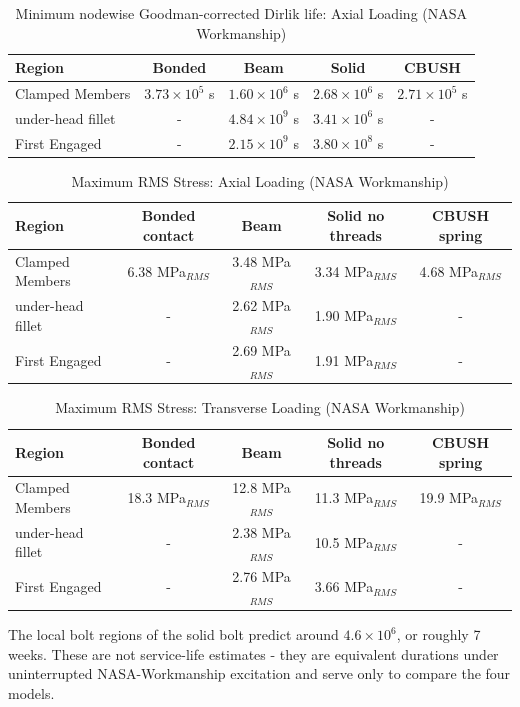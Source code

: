 \documentclass[a4paper,twoside]{bth}
\begin{document}
\begin{table}[H]
    \centering
    \caption{Minimum nodewise Goodman-corrected Dirlik life: Axial Loading (NASA Workmanship)}
    \label{tab:MinLifeVtical}
    \begin{tabular}{lcccc}
        \toprule
        Region          & Bonded               & Beam                  & Solid                 & CBUSH                  \\
        \midrule
        Clamped Members & $3.73\times10^{5}$ s & $1.60\times10^{6}$ s  & $2.68\times10^{6}$ s  & $2.71\times10^{5}$ s  \\
        under-head fillet   & -                   & $4.84\times10^{9}$ s  & $3.41\times10^{6}$ s  & -                    \\
        First Engaged   & -                   & $2.15\times10^{9}$ s  & $3.80\times10^{8}$ s  & -                    \\
        \bottomrule
    \end{tabular}
\end{table}

\begin{table}[H]
    \centering
    \caption{Maximum \ac{RMS} Stress: Axial Loading (NASA Workmanship)}
    \label{tab:MaxRMS_HorizNASA}
    \begin{tabular}{lcccc}
        \toprule
        Region & Bonded contact & Beam & Solid no threads & CBUSH spring \\
        \midrule
        Clamped Members & 6.38 MPa$_{RMS}$ & 3.48 MPa$_{RMS}$ & 3.34 MPa$_{RMS}$ & 4.68 MPa$_{RMS}$ \\
        under-head fillet & -              & 2.62 MPa$_{RMS}$ & 1.90 MPa$_{RMS}$ & -                \\
        First Engaged   & -                & 2.69 MPa$_{RMS}$ & 1.91 MPa$_{RMS}$ & -                \\
        \bottomrule
    \end{tabular}
\end{table}

\begin{table}[H]
    \centering
    \caption{Maximum \ac{RMS} Stress: Transverse Loading (NASA Workmanship)}
    \label{tab:MaxRMS_VertNASA}
    \begin{tabular}{lcccc}
        \toprule
        Region & Bonded contact & Beam & Solid no threads & CBUSH spring \\
        \midrule
        Clamped Members & 18.3 MPa$_{RMS}$ & 12.8 MPa$_{RMS}$ & 11.3 MPa$_{RMS}$ & 19.9 MPa$_{RMS}$ \\
        under-head fillet & -              & 2.38 MPa$_{RMS}$ & 10.5 MPa$_{RMS}$ & -                \\
        First Engaged   & -                & 2.76 MPa$_{RMS}$ & 3.66 MPa$_{RMS}$ & -                \\
        \bottomrule
    \end{tabular}
\end{table}
The local bolt regions of the solid bolt predict around $4.6 \times 10^6$, or roughly 7 weeks. These are not service-life estimates - they are equivalent durations under uninterrupted NASA-Workmanship excitation and serve only to compare the four models.
\end{document}

